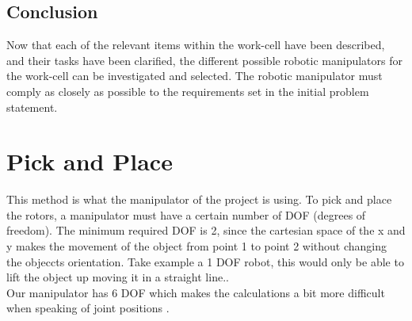  \subsection{Conclusion}
 Now that each of the relevant items within the work-cell have been described, and their tasks have been clarified, the different possible robotic manipulators for the work-cell can be investigated and selected. The robotic manipulator must comply as closely as possible to the requirements set in the initial problem statement. 
 
 \section{Pick and Place}

This method is what the manipulator of the project is using. To pick and place the rotors, a manipulator must have a certain number of DOF (degrees of freedom). The minimum required DOF is 2, since the cartesian space of the x and y makes the movement of the object from point 1 to point 2 without changing the objeccts orientation. Take example a 1 DOF robot, this would only be able to lift the object up moving it in a straight line..\\
Our manipulator has 6 DOF which makes the calculations a bit more difficult when speaking of joint positions \cite{DOF}.\\
 


